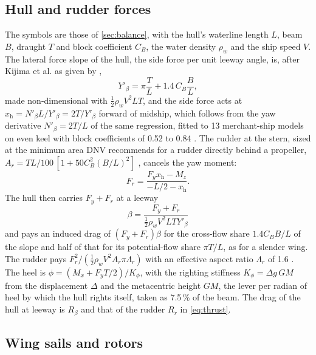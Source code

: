 \subsection{Hull and rudder forces}
\label{sec:det_balance}

The symbols are those of \cref{sec:balance}, with the hull's waterline length $L$, beam $B$, draught $T$ and block coefficient $C_B$, the water density $\rho_w$ and the ship speed $V$. The lateral force slope of the hull, the side force per unit leeway angle, is, after Kijima et al. as given by \citet{kim2021},
\begin{equation}
Y'_\beta = \pi\frac{T}{L} + 1.4\,C_B\frac{B}{L},
\end{equation}
made non-dimensional with $\tfrac12\rho_w V^2 L T$, and the side force acts at $x_\mathrm{h} = N'_\beta L/Y'_\beta = 2T/Y'_\beta$ forward of midship, which follows from the yaw derivative $N'_\beta=2T/L$ of the same regression, fitted to 13 merchant-ship models on even keel with block coefficients of 0.52 to 0.84 \citep{kim2021}. The rudder at the stern, sized at the minimum area DNV recommends for a rudder directly behind a propeller, $A_r = TL/100\,[1+50C_B^2(B/L)^2]$ \citep{dnv_rudder}, cancels the yaw moment:
\begin{equation}
F_r = \frac{F_y x_\mathrm{h} - M_z}{-L/2 - x_\mathrm{h}}.
\end{equation}
The hull then carries $F_y+F_r$ at a leeway
\begin{equation}
\beta = \frac{F_y+F_r}{\tfrac12\rho_w V^2 L T Y'_\beta}
\end{equation}
and pays an induced drag of $(F_y+F_r)\beta$ for the cross-flow share $1.4C_BB/L$ of the slope and half of that for its potential-flow share $\pi T/L$, as for a slender wing. The rudder pays $F_r^2/(\tfrac12\rho_w V^2 A_r \pi \Lambda_r)$ with an effective aspect ratio $\Lambda_r$ of 1.6 \citep{kramer2022}. The heel is $\phi = (M_x + F_y T/2)/K_\phi$, with the righting stiffness $K_\phi = \Delta g\,GM$ from the displacement $\Delta$ and the metacentric height $GM$, the lever per radian of heel by which the hull rights itself, taken as 7.5\,\% of the beam. The drag of the hull at leeway is $R_\beta$ and that of the rudder $R_r$ in \cref{eq:thrust}.

\subsection{Wing sails and rotors}
\label{sec:det_deck}

